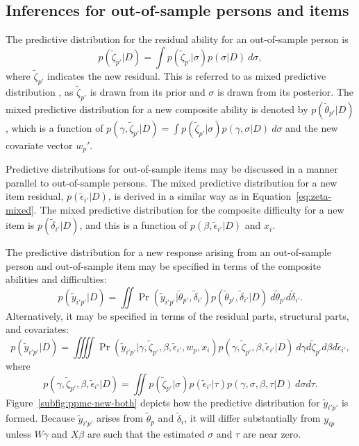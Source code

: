 \documentclass[12pt, letterpaper]{article}
\begin{document}
\subsection{Inferences for out-of-sample persons and items}

The predictive distribution for the residual ability for an out-of-sample person is
\begin{equation} \label{eq:zeta-mixed}
	p(\tilde \zeta_{p'} | D) = 
	\int
		p(\tilde \zeta_{p'} | \sigma)
		p(\sigma | D)
	~d\sigma
,\end{equation}
where $\tilde \zeta_{p'}$ indicates the new residual. This is referred to as mixed predictive distribution \parencite{Gelman1996}, as $\tilde \zeta_{p'}$ is drawn from its prior and $\sigma$ is drawn from its posterior. The mixed predictive distribution for a new composite ability is denoted by $p(\tilde \theta_{p'} | D)$, which is a function of 
	$p(\gamma, \tilde \zeta_{p'} | D) = 
	\int p(\tilde \zeta_{p'} | \sigma) p(\gamma, \sigma | D) ~d \sigma$
and the new covariate vector $w_p'$.

Predictive distributions for out-of-sample items may be discussed in a manner parallel to out-of-sample persons. The mixed predictive distribution for a new item residual, $p(\tilde \epsilon_{i'} | D)$, is derived in a similar way as in Equation~\ref{eq:zeta-mixed}. The mixed predictive distribution for the composite difficulty for a new item is $p(\tilde \delta_{i'} | D)$, and this is a function of $p(\beta, \tilde \epsilon_{i'} | D)$ and $x_i$.

The predictive distribution for a new response arising from an out-of-sample person and out-of-sample item may be specified in terms of the composite abilities and difficulties:
\begin{equation}
	p(\tilde y_{i'p'} | D) =
	\iint
		\Pr (\tilde y_{i'p'} | \tilde \theta_{p'}, \tilde \delta_{i'})
		p(\tilde \theta_{p'}, \tilde \delta_{i'} | D)
	~d\tilde \theta_{p'} d \tilde \delta_{i'}
.\end{equation}
Alternatively, it may be specified in terms of the residual parts, structural parts, and covariates:
\begin{equation}
	p(\tilde y_{i'p'} | D) =
	\iiiint
		\Pr (\tilde y_{i'p'} | \gamma,\tilde \zeta_{p'}, \beta, 
			\tilde \epsilon_{i'}, w_p, x_i)
		p(\gamma, \tilde \zeta_{p'}, \beta, \tilde \epsilon_{i'} | D)
	~d\gamma d \tilde \zeta_{p'} d \beta d \tilde \epsilon_{i'}
,\end{equation}
where
\begin{equation}
	p(\gamma, \tilde \zeta_{p'}, \beta, \tilde \epsilon_{i'} | D) = 
	\iint
		p(\tilde \zeta_{p'} | \sigma)
		p(\tilde \epsilon_{i'} | \tau)
		 p(\gamma, \sigma, \beta, \tau | D)
	~d \sigma d \tau
.\end{equation}
Figure~\ref{subfig:ppmc-new-both} depicts how the predictive distribution for $\tilde y_{i'p'}$ is formed. Because $\tilde y_{i'p'}$ arises from $\tilde \theta_p$ and $\tilde \delta_i$, it will differ substantially from $y_{ip}$ unless $W \gamma$ and $X \beta$ are such that the estimated $\sigma$ and $\tau$ are near zero.
\end{document}
